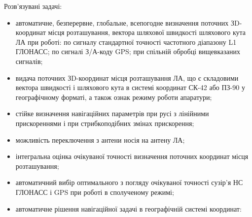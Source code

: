 Розв'язувані задачі:
\begin{itemize}
\item автоматичне, безперервне, глобальне, всепогодне визначення поточних ЗD-координат 
місця розташування, вектора шляхової швидкості шляхового кута ЛА при роботі: по 
сигналу стандартної точності частотного діапазону L1 ГЛОНАСС; по сигналі З/А-коду 
GPS; при спільній обробці вищевказаних сигналів;
\item видача поточних ЗD-координат місця розташування ЛА, що є складовими вектора 
швидкості і шляхового кута в системі координат СК-42 або ПЗ-90 у географічному 
форматі, а також ознак режиму роботи апаратури;
\item стійке визначення навігаційних параметрів при русі з лінійними прискореннями 
і при стрибкоподібних змінах прискорення;
\item  можливість переключення з антени носія на антену ЛА; 
\item інтегральна оцінка очікуваної точності визначення поточних координат місця розташування;
\item автоматичний вибір оптимального з погляду очікуваної точності сузір'я НС ГЛОНАСС і GPS при роботі в сполученому режимі;
\item автоматичне рішення навігаційної задачі в географічній системі координат:  
\end{itemize}